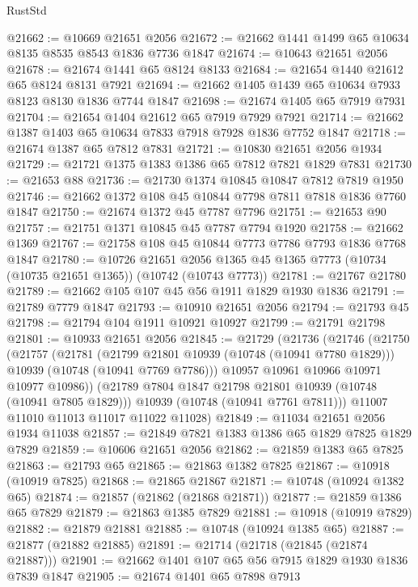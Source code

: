 \begin{lexlean}{RustStd}
\begin{coremodule}
@21662 := @10669 @21651 @2056
@21672 := @21662 @1441 @1499 @65 @10634 @8135 @8535 @8543 @1836 @7736 @1847
@21674 := @10643 @21651 @2056
@21678 := @21674 @1441 @65 @8124 @8133
@21684 := @21654 @1440 @21612 @65 @8124 @8131 @7921
@21694 := @21662 @1405 @1439 @65 @10634 @7933 @8123 @8130 @1836 @7744 @1847
@21698 := @21674 @1405 @65 @7919 @7931
@21704 := @21654 @1404 @21612 @65 @7919 @7929 @7921
@21714 := @21662 @1387 @1403 @65 @10634 @7833 @7918 @7928 @1836 @7752 @1847
@21718 := @21674 @1387 @65 @7812 @7831
@21721 := @10830 @21651 @2056 @1934
@21729 := @21721 @1375 @1383 @1386 @65 @7812 @7821 @1829 @7831
@21730 := @21653 @88
@21736 := @21730 @1374 @10845 @10847 @7812 @7819 @1950
@21746 := @21662 @1372 @108 @45 @10844 @7798 @7811 @7818 @1836 @7760 @1847
@21750 := @21674 @1372 @45 @7787 @7796
@21751 := @21653 @90
@21757 := @21751 @1371 @10845 @45 @7787 @7794 @1920
@21758 := @21662 @1369
@21767 := @21758 @108 @45 @10844 @7773 @7786 @7793 @1836 @7768 @1847
@21780 := @10726
    @21651
    @2056
    @1365
    @45
    @1365
    @7773
    (@10734 (@10735 @21651 @1365))
    (@10742 (@10743 @7773))
@21781 := @21767 @21780
@21789 := @21662 @105 @107 @45 @56 @1911 @1829 @1930 @1836
@21791 := @21789 @7779 @1847
@21793 := @10910 @21651 @2056
@21794 := @21793 @45
@21798 := @21794 @104 @1911 @10921 @10927
@21799 := @21791 @21798
@21801 := @10933 @21651 @2056
@21845 := @21729
    (@21736
      (@21746
        (@21750
          (@21757
            (@21781
              (@21799 @21801 @10939 (@10748 (@10941 @7780 @1829)))
              @10939
              (@10748 (@10941 @7769 @7786)))
            @10957
            @10961
            @10966
            @10971
            @10977
            @10986))
        (@21789 @7804 @1847 @21798 @21801 @10939 (@10748 (@10941 @7805 @1829)))
        @10939
        (@10748 (@10941 @7761 @7811)))
      @11007
      @11010
      @11013
      @11017
      @11022
      @11028)
@21849 := @11034 @21651 @2056 @1934 @11038
@21857 := @21849 @7821 @1383 @1386 @65 @1829 @7825 @1829 @7829
@21859 := @10606 @21651 @2056
@21862 := @21859 @1383 @65 @7825
@21863 := @21793 @65
@21865 := @21863 @1382 @7825
@21867 := @10918 (@10919 @7825)
@21868 := @21865 @21867
@21871 := @10748 (@10924 @1382 @65)
@21874 := @21857 (@21862 (@21868 @21871))
@21877 := @21859 @1386 @65 @7829
@21879 := @21863 @1385 @7829
@21881 := @10918 (@10919 @7829)
@21882 := @21879 @21881
@21885 := @10748 (@10924 @1385 @65)
@21887 := @21877 (@21882 @21885)
@21891 := @21714 (@21718 (@21845 (@21874 @21887)))
@21901 := @21662 @1401 @107 @65 @56 @7915 @1829 @1930 @1836 @7839 @1847
@21905 := @21674 @1401 @65 @7898 @7913

\end{coremodule}
\end{lexlean}
